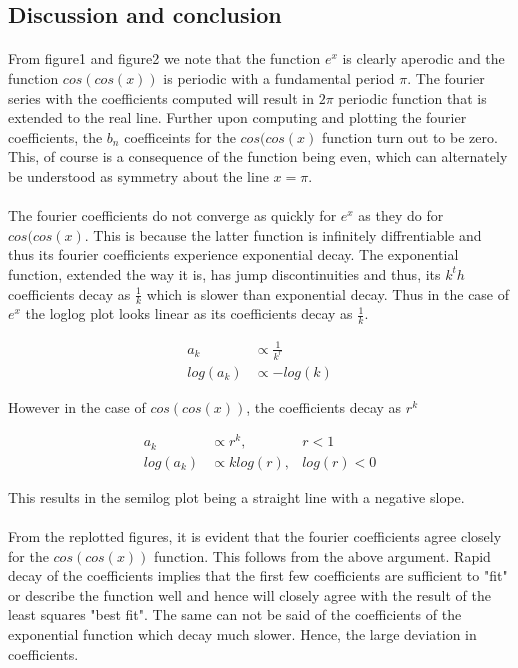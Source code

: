 \documentclass[a4paper, 12pt, margin= 1.25cm ]{article}
\begin{document}
\begin{multicols}{2}
    \section{Discussion and conclusion}\label{discussion-and-conlusion}

\paragraph{} From figure1 and figure2 we note that the function $e^x$ is clearly
aperodic and the function $cos(cos(x))$ is periodic with a fundamental
period $\pi$. The fourier series with the coefficients computed will
result in $2\pi$ periodic function that is extended to the real line.
Further upon computing and plotting the fourier coefficients, the $b_n$
coefficeints for the $cos(cos(x)$ function turn out to be zero. This, of
course is a consequence of the function being even, which can
alternately be understood as symmetry about the line $x = \pi$. 

\paragraph{} The fourier coefficients do not converge as quickly for $e^x$ as they do for
$cos(cos(x)$. This is because the latter function is infinitely
diffrentiable and thus its fourier coefficients experience exponential
decay. The exponential function, extended the way it is, has jump
discontinuities and thus, its $k^th$ coefficients decay as $\frac{1}{k}$
which is slower than exponential decay. Thus in the case of $e^x$ the
loglog plot looks linear as its coefficients decay as $\frac{1}{k}$.

\begin{align*}
a_k  &\propto  \frac{1}{k^r}\\
log(a_k)  &\propto -log(k)
\end{align*}

However in the case of $cos(cos(x))$, the coefficients decay as $r^k$

\begin{align*}
a_k  &\propto  r^k,   &r<1\\
log(a_k)  &\propto  klog(r),  &log(r)<0
\end{align*}

This results in the semilog plot being a straight line with a negative
slope.
\paragraph{} From the replotted figures, it is evident that the fourier coefficients
agree closely for the $cos(cos(x))$ function. This follows from the
above argument. Rapid decay of the coefficients implies that the first
few coefficients are sufficient to "fit" or describe the function well
and hence will closely agree with the result of the least squares "best
fit". The same can not be said of the coefficients of the exponential
function which decay much slower. Hence, the large deviation in
coefficients.

\end{multicols}
\end{document}
